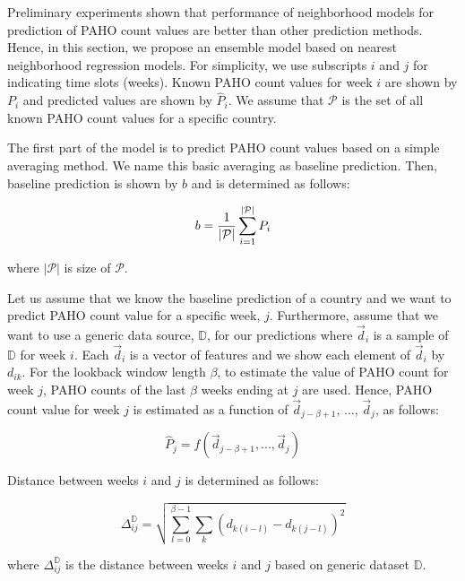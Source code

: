 

Preliminary experiments shown that performance of neighborhood models for prediction of PAHO count values are better than other prediction methods. Hence, in this section, we propose an ensemble model based on nearest neighborhood regression models. For simplicity, we use subscripts $i$ and $j$ for indicating time slots (weeks). Known PAHO count values for week $i$ are shown by $P_{i}$ and predicted values are shown by $\hat{P}_{i}$. We assume that $\mathcal{P}$ is the set of all known PAHO count values for a specific country.

The first part of the model is to predict PAHO count values based on a simple averaging method. We name this basic averaging as baseline prediction. Then, baseline prediction is shown by $b$ and is determined as follows:

\begin{equation}
b = {1 \over {|\mathcal{P}|}} \sum_{i=1}^{|\mathcal{P}|}P_{i}
\end{equation}

where $|\mathcal{P}|$ is size of $\mathcal{P}$. 

Let us assume that we know the baseline prediction of a country and we want to predict PAHO count value for a specific week, $j$. Furthermore, assume that we want to use a generic data source, $\mathbb{D}$, for our predictions where $\vec{d}_i$ is a sample of $\mathbb{D}$ for week $i$. Each $\vec{d}_i$ is a vector of features and we show each element of $\vec{d}_i$ by $d_{ik}$. For the lookback window length $\beta$, to estimate the value of PAHO count for week $j$, PAHO counts of the last $\beta$ weeks ending at $j$ are used. Hence, PAHO count value for week $j$ is estimated as a function of $\vec{d}_{j-\beta+1}$, ..., $\vec{d}_{j}$, as follows:

\begin{equation}
\hat{P}_{j} = \mathit{f}(\vec{d}_{j-\beta+1},...,\vec{d}_{j})
\end{equation}

Distance between weeks $i$ and $j$ is determined as follows:

\begin{equation}
\Delta_{ij}^\mathbb{D} = \sqrt{\sum_{l=0}^{\beta-1} \sum_{k} (d_{k(i-l)}-d_{k(j-l)})^2}
\end{equation}

where $\Delta_{ij}^\mathbb{D}$ is the distance between weeks $i$ and $j$ based on generic dataset $\mathbb{D}$.

